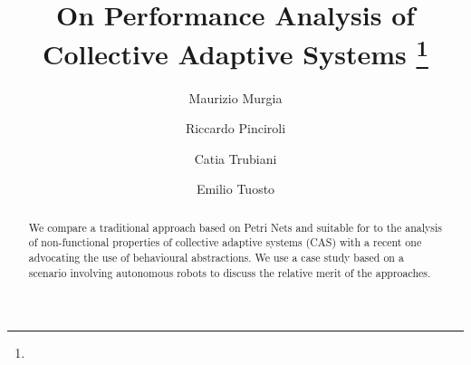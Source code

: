 \mainmatter  %

\title{
  On Performance Analysis of Collective Adaptive Systems
  \thanks{\tnxbehapi\tnxitmatters\tnxseduce[and]}
}


\author{
  Maurizio Murgia \and
  Riccardo Pinciroli \and
  Catia Trubiani \and
  Emilio Tuosto
}


\iffinal
{}
\else
{}
\fi

\maketitle

\begin{abstract}
  We compare a traditional approach based on Petri Nets and suitable
  for to the analysis of non-functional properties of collective
  adaptive systems (CAS) with a recent one advocating the use of
  behavioural abstractions.
  We use a case study based on a scenario involving autonomous robots
  to discuss the relative merit of the approaches.
\end{abstract}


